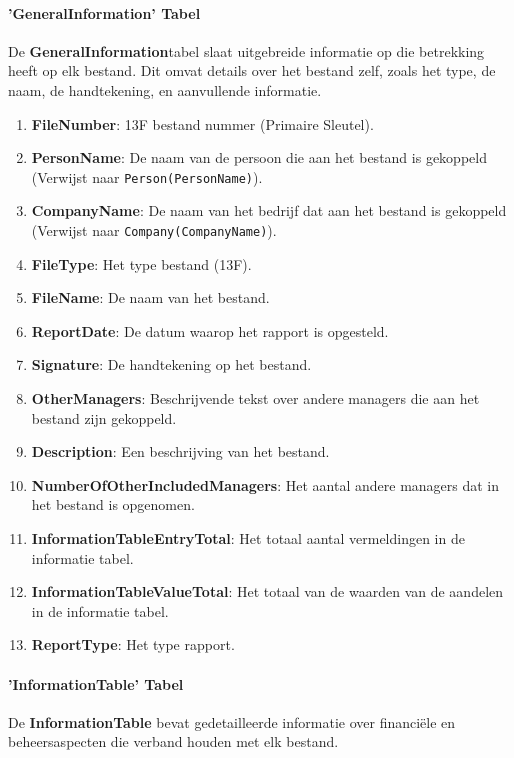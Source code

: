 \paragraph{'GeneralInformation' Tabel}

De \textbf{GeneralInformation}tabel slaat uitgebreide informatie op die betrekking heeft op elk bestand. Dit omvat details over het bestand zelf, zoals het type, de naam, de handtekening, en aanvullende informatie.


\begin{enumerate}
    \item \textbf{FileNumber}: 13F bestand nummer (Primaire Sleutel).
    \item \textbf{PersonName}: De naam van de persoon die aan het bestand is gekoppeld (Verwijst naar \texttt{Person(PersonName)}).
    \item \textbf{CompanyName}: De naam van het bedrijf dat aan het bestand is gekoppeld (Verwijst naar \texttt{Company(CompanyName)}).
    \item \textbf{FileType}: Het type bestand (13F).
    \item \textbf{FileName}: De naam van het bestand.
    \item \textbf{ReportDate}: De datum waarop het rapport is opgesteld.
    \item \textbf{Signature}: De handtekening op het bestand.
    \item \textbf{OtherManagers}: Beschrijvende tekst over andere managers die aan het bestand zijn gekoppeld.
    \item \textbf{Description}: Een beschrijving van het bestand.
    \item \textbf{NumberOfOtherIncludedManagers}: Het aantal andere managers dat in het bestand is opgenomen.
    \item \textbf{InformationTableEntryTotal}: Het totaal aantal vermeldingen in de informatie tabel.
    \item \textbf{InformationTableValueTotal}: Het totaal van de waarden van de aandelen in de informatie tabel.
    \item \textbf{ReportType}: Het type rapport.
\end{enumerate}

\paragraph{'InformationTable' Tabel}

De \textbf{InformationTable} bevat gedetailleerde informatie over financiële en beheersaspecten die verband houden met elk bestand.


